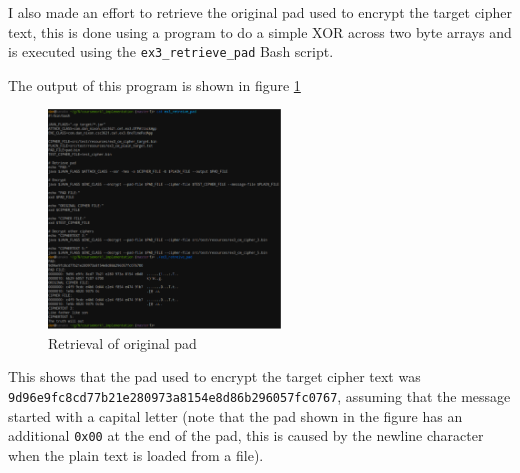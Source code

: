 \documentclass[a4paper]{article}
\begin{document}
I also made an effort to retrieve the original pad used to encrypt the target
cipher text, this is done using a program to do a simple XOR across two byte
arrays and is executed using the \texttt{ex3\_retrieve\_pad} Bash script.

The output of this program is shown in figure \ref{fig:retrieve_pad}

\begin{figure}[h!]
  \centering
  \includegraphics[width=0.55\textwidth]{graphics/ex3_obtain_pad.eps}
  \caption{Retrieval of original pad}
  \label{fig:retrieve_pad}
\end{figure}

This shows that the pad used to encrypt the target cipher text was \\
\texttt{9d96e9fc8cd77b21e280973a8154e8d86b296057fc0767}, assuming that the
message started with a capital letter (note that the pad shown in the figure has
an additional \texttt{0x00} at the end of the pad, this is caused by the newline
character when the plain text is loaded from a file).
\end{document}
